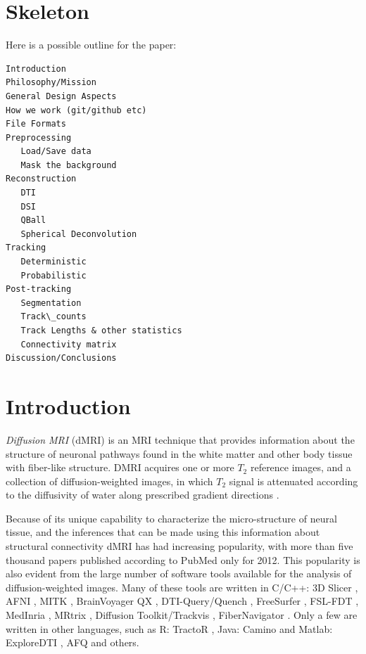 \documentclass{bioinfo}
\begin{document}
\section{Skeleton}
Here is a possible outline for the paper:
\begin{verbatim}
Introduction
Philosophy/Mission
General Design Aspects
How we work (git/github etc)
File Formats 
Preprocessing
   Load/Save data
   Mask the background
Reconstruction
   DTI 
   DSI
   QBall
   Spherical Deconvolution 
Tracking
   Deterministic
   Probabilistic
Post-tracking
   Segmentation
   Track\_counts
   Track Lengths & other statistics
   Connectivity matrix
Discussion/Conclusions
\end{verbatim}

\section{Introduction}

\emph{Diffusion MRI} (dMRI) \citep{stejskal-tanner:65,
  lebihan-breton:85,merboldt-hanicke-etal:85, taylor-bushell:85, callaghan:91}
is an MRI technique that provides information about the structure of neuronal pathways found in the white matter and other body tissue with fiber-like structure. DMRI acquires one or more $T_{2}$ reference images, and a collection of diffusion-weighted images, in which $T_{2}$ signal is attenuated according to the  diffusivity of water along prescribed gradient directions \citep{behrens-johansen-berg:09, jones:10}.

Because of its unique capability to characterize the micro-structure of neural tissue, and the inferences that can be made using this information about structural connectivity dMRI has had increasing popularity, with more than five thousand papers published according to PubMed only for 2012. This popularity is also evident from the large number of software tools available for the analysis of diffusion-weighted images. Many of these tools are written in C/C++: 3D Slicer \citep{pieper:06}, AFNI \citep{cox-afni:12}, MITK \citep{fritzsche-mitk:12}, BrainVoyager QX \citep{goebel-brainvoyager:12}, DTI-Query/Quench \citep{sherbondy:05}, FreeSurfer \citep{fischl-freesurfer:12}, FSL-FDT \citep{smith-fdt:04}, MedInria \citep{toussaint-souplet-etal:07}, MRtrix \citep{Tournier2012}, Diffusion Toolkit/Trackvis \citep{wang-diffusion-toolkit:07}, FiberNavigator \citep{vaillancourt:11, chamberland:13}. Only a few are written in other languages, such as R: TractoR \citep{ clayden-TractoR:11}, Java: Camino \citep{Cook2006} and Matlab: ExploreDTI \citep{leemans-exploredti:09}, AFQ \citep{yeatman2012afq} and others.
\end{document}
